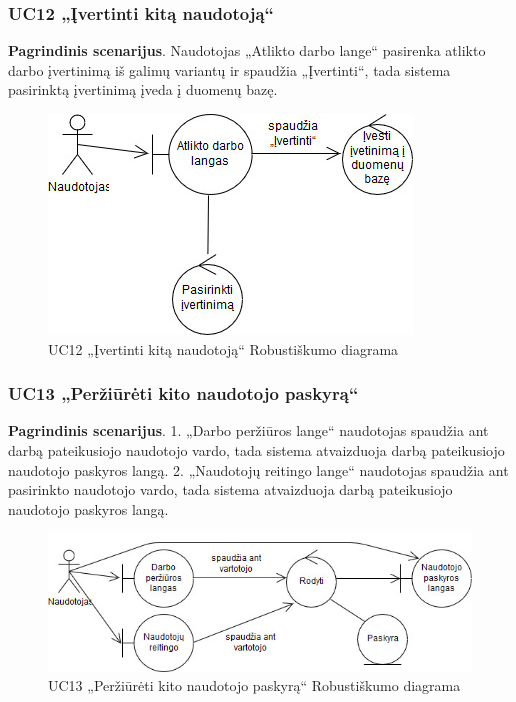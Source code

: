 \documentclass{VUMIFPSbakalaurinis}
\begin{document}
\subsubsection{UC12 „Įvertinti kitą naudotoją“}
\textbf{Pagrindinis scenarijus}. Naudotojas „Atlikto darbo lange“ pasirenka atlikto darbo įvertinimą iš galimų variantų ir spaudžia „Įvertinti“, tada sistema pasirinktą įvertinimą įveda į duomenų bazę.

\begin{figure}[H]
	\centering
	\includegraphics[scale=0.6]{img/Robustness/UC12}
	\caption{UC12 „Įvertinti kitą naudotoją“ Robustiškumo diagrama}
	\label{img:uc12rob}
\end{figure}

\subsubsection{UC13 „Peržiūrėti kito naudotojo paskyrą“}
\textbf{Pagrindinis scenarijus}. 1. „Darbo peržiūros lange“ naudotojas spaudžia ant darbą pateikusiojo naudotojo vardo, tada sistema atvaizduoja darbą pateikusiojo naudotojo paskyros langą.
2. „Naudotojų reitingo lange“ naudotojas spaudžia ant pasirinkto naudotojo vardo, tada sistema atvaizduoja darbą pateikusiojo naudotojo paskyros langą.

\begin{figure}[H]
	\centering
	\includegraphics[scale=0.6]{img/Robustness/UC13}
	\caption{UC13 „Peržiūrėti kito naudotojo paskyrą“ Robustiškumo diagrama}
	\label{img:uc13rob}
\end{figure}
\end{document}

